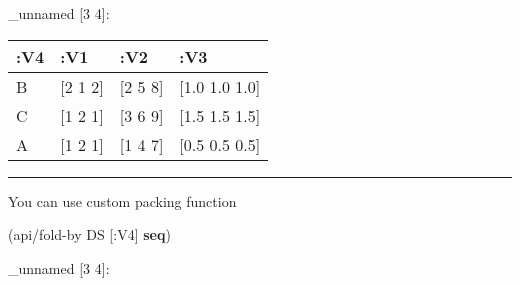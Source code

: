 \documentclass[]{article}
\newenvironment{Shaded}{\begin{snugshade}}{\end{snugshade}}
\newcommand{\KeywordTok}[1]{\textcolor[rgb]{0.13,0.29,0.53}{\textbf{#1}}}
\newcommand{\AttributeTok}[1]{\textcolor[rgb]{0.77,0.63,0.00}{#1}}
\newcommand{\NormalTok}[1]{#1}
\begin{document}
\_unnamed {[}3 4{]}:

\begin{longtable}[]{@{}llll@{}}
\toprule
:V4 & :V1 & :V2 & :V3\tabularnewline
\midrule
\endhead
B & {[}2 1 2{]} & {[}2 5 8{]} & {[}1.0 1.0 1.0{]}\tabularnewline
C & {[}1 2 1{]} & {[}3 6 9{]} & {[}1.5 1.5 1.5{]}\tabularnewline
A & {[}1 2 1{]} & {[}1 4 7{]} & {[}0.5 0.5 0.5{]}\tabularnewline
\bottomrule
\end{longtable}

\begin{center}\rule{0.5\linewidth}{0.5pt}\end{center}

You can use custom packing function

\begin{Shaded}
\begin{Highlighting}[]
\NormalTok{(api/fold-by DS [}\AttributeTok{:V4}\NormalTok{] }\KeywordTok{seq}\NormalTok{)}
\end{Highlighting}
\end{Shaded}

\_unnamed {[}3 4{]}:
\end{document}
